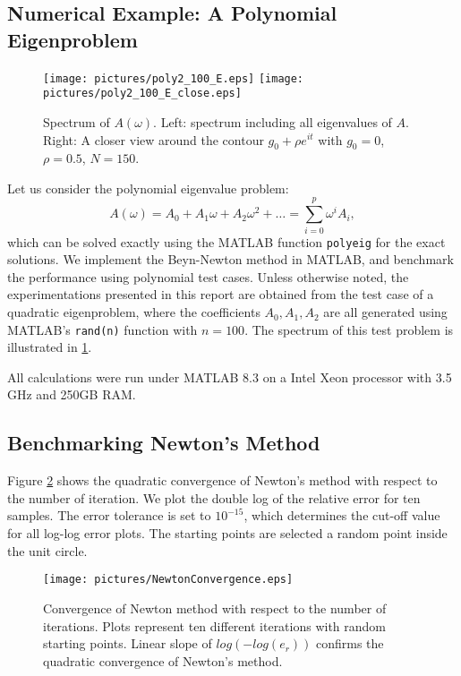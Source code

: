 \documentclass[final,leqno,onefignum,onetabnum]{siamltex1213}
\begin{document}
\subsection{Numerical Example: A Polynomial Eigenproblem}
\begin{figure}
\label{fig:E}
\begin{center}
\texttt{[image: pictures/poly2\_100\_E.eps]}
\texttt{[image: pictures/poly2\_100\_E\_close.eps]}
\end{center}
\caption{Spectrum of $A(\omega)$. \textnormal{Left: spectrum including all eigenvalues of $A$. Right: A closer view around the contour $g_0+\rho e^{it}$ with $g_0=0$, $\rho=0.5$, $N=150$.}}
\end{figure}

Let us consider the polynomial eigenvalue problem:
\begin{equation}
\label{eq:polyeig}
A(\omega)= A_0+A_1 \omega + A_2 \omega^2 + \ldots =\sum\limits_{i=0}^{p}\omega^iA_i ,
\end{equation}
which can be solved exactly using the MATLAB function {\tt polyeig} for the exact solutions. We implement the Beyn-Newton method in MATLAB, and benchmark the performance using polynomial test cases. Unless otherwise noted, the experimentations presented in this report are obtained from the test case of a quadratic eigenproblem, where the coefficients $A_0, A_1, A_2$ are all generated using MATLAB's {\tt rand(n)} function with $n=100$. The spectrum of this test problem is illustrated in \ref{fig:E}. 

All calculations were run under MATLAB 8.3 on a Intel Xeon processor with 3.5 GHz and 250GB RAM. 
\subsection{Benchmarking Newton's Method}
Figure \ref{fig:NewtonBenchmark} shows the quadratic convergence of Newton's method with respect to the number of iteration. We plot the double log of the relative error for ten samples. The error tolerance is set to $10^{-15}$, which determines the cut-off value for all log-log error plots. The starting points are selected a random point inside the unit circle. 
\begin{figure}\label{fig:NewtonBenchmark}
\begin{center}
\texttt{[image: pictures/NewtonConvergence.eps]}
\end{center}
\caption{Convergence of Newton method with respect to the number of iterations. \textnormal{Plots represent ten different iterations with random starting points. Linear slope of $log(-log(e_r))$ confirms the quadratic convergence of Newton's method.}}
\end{figure}
\end{document}
